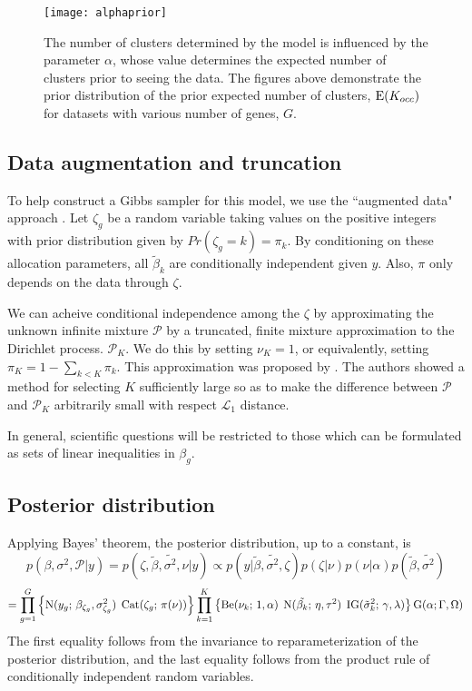 \begin{figure}
\texttt{[image: alphaprior]}
\caption{The number of clusters determined by the model is influenced by the parameter $\alpha$, whose value determines the expected number of clusters prior to seeing the data. The figures above demonstrate the prior distribution of the prior expected number of clusters, $\operatorname{E}(K_{occ})$ for datasets with various number of genes, $G$.}
\label{alphaprior}
\end{figure}

\subsection{Data augmentation and truncation}
\label{subsec:reparam}
To help construct a Gibbs sampler for this model, we use the ``augmented data" approach \cite{tanner}. Let $\zeta_g$ be a random variable taking values on the positive integers with prior distribution given by $Pr(\zeta_g=k)=\pi_k$. By conditioning on these allocation parameters, all $\tilde{\beta}_k$ are conditionally independent given $y$. Also, $\pi$ only depends on the data through $\zeta$.

We can acheive conditional independence among the $\zeta$ by approximating the unknown infinite mixture $\mathcal{P}$ by a truncated, finite mixture approximation to the Dirichlet process. $\mathcal{P}_K$. We do this by setting $\nu_K=1$, or equivalently, setting $\pi_K = 1 - \sum_{k<K} \pi_k$. This approximation was proposed by \citet{ishwaran2000}. The authors showed a method for selecting $K$ sufficiently large so as to make the difference between $\mathcal{P}$ and $\mathcal{P}_K$ arbitrarily small with respect $\mathcal{L}_1$ distance. 

In general, scientific questions will be restricted to those which can be formulated as sets of linear inequalities in $\beta_g$. 

\subsection{Posterior distribution}
\label{subsec:posterior}
Applying Bayes' theorem, the posterior distribution, up to a constant, is
\begin{equation*}
p(\beta,\sigma^2,\mathcal{P}|y) = p(\zeta, \tilde{\beta},\tilde{\sigma^2},\nu | y) \propto p(y|\tilde{\beta},\tilde{\sigma^2},\zeta) p(\zeta|\nu) p(\nu|\alpha)p(\tilde{\beta},\tilde{\sigma^2})
\end{equation*}
\begin{equation*}
= \prod_{g=1}^G \left\{ \operatorname{N}(y_g;\,\beta_{\zeta_g},\sigma^2_{\zeta_g})\; \operatorname{Cat}(\zeta_g;\, \pi(\nu)) \right\} \prod_{k=1}^K \left\{ \operatorname{Be}(\nu_k;\, 1, \alpha)\; \operatorname{N}(\tilde{\beta_k};\,\eta, \tau^2)\;\operatorname{IG}(\tilde{\sigma}^2_k;\,\gamma,\lambda)\right\} \operatorname{G}(\alpha;\Gamma,\Omega) 
\end{equation*}
The first equality follows from the  invariance to reparameterization of the posterior distribution, and the last equality follows from the product rule of conditionally independent random variables.

